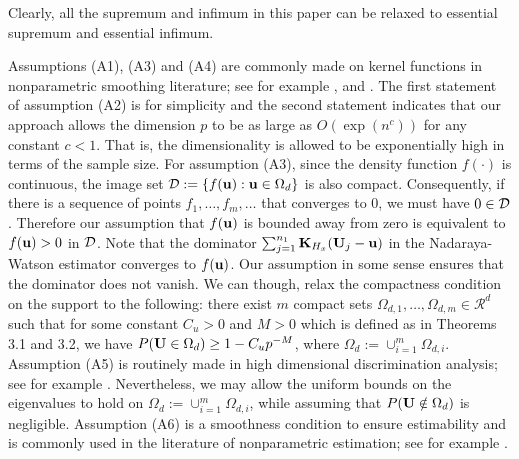 \documentclass[11pt]{article}
\theoremstyle{definition}
\begin{document}
\begin{itemize}
 	
 	Clearly, all the supremum and infimum in this paper can be relaxed to essential supremum and essential infimum.
 	
 \end{itemize}
 
 
 
 Assumptions (A1), (A3) and (A4) are commonly made on kernel functions in nonparametric
 smoothing literature; see for example \cite{Einmahl}, \cite{Fan1996} and \cite{Pagan}. The first statement of assumption (A2) is for simplicity and the
 second statement indicates that our approach allows the dimension $p$ to be as
 large as $O(\exp(n^{c}))$ for any constant $c<1$. That is, the
 dimensionality is allowed to be exponentially high in terms of the sample
 size.
 For assumption (A3), since the density function $f(\cdot)$ is continuous, the image set  ${\cal D}:=\{f({\bf u}): {\bf u}\in \Omega_d\}$ is also compact. Consequently, if there is a sequence of points $f_1,\ldots, f_m,\ldots$ that converges to 0, we must have $0\in {\cal D}$. Therefore our assumption that $f({\bf u})$ is bounded away from zero is equivalent to $f({\bf u})>0$ in ${\cal D}$. Note that the dominator $\sum_{j=1}^{n_1}{\bf K}_{H_x}({\bf U}_j-{\bf u})$ in the Nadaraya-Watson estimator converges to $f({\bf u})$. Our  assumption in some sense ensures that the dominator does not vanish. 
 We can though, relax the compactness condition on the support to the following: there exist $m$ compact sets $\Omega_{d,1},\ldots,\Omega_{d,m}\in {\mathcal R}^d$ such that for some constant $C_u>0$ and $M>0$ which is defined as in Theorems 3.1 and 3.2, we have $P({\bf U}\in \Omega_{d})\geq 1-C_up^{-M}$, where $ \Omega_{d}:=\cup_{i=1}^m\Omega_{d,i}$. 
 Assumption (A5) is routinely made in high dimensional discrimination analysis; see for example \cite{Cai}. Nevertheless, we may allow the uniform bounds on the eigenvalues to hold on $ \Omega_{d}:=\cup_{i=1}^m\Omega_{d,i}$, while assuming that $P({\bf U}\notin \Omega_{d})$ is negligible. 
 Assumption (A6) is a smoothness condition to ensure estimability and is commonly used in the literature of nonparametric estimation; see for example \cite{Fan1996,Tsybakov}.  
 
\end{document}
